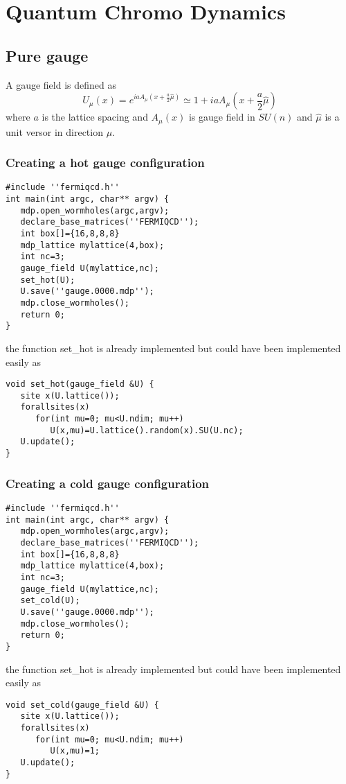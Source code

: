 \section{Quantum Chromo Dynamics}

\subsection{Pure gauge}

A gauge field is defined as 
\[
U_\mu (x)=e^{iaA_\mu (x+\frac a2\widehat{\mu })}\simeq 1+iaA_\mu (x+\frac a2%
\widehat{\mu })
\]
where $a$ is the lattice spacing and $A_\mu (x)$ is gauge field in $SU(n)$
and $\widehat{\mu }$ is a unit versor in direction $\mu $.

\subsubsection{Creating a hot gauge configuration}
\begin{verbatim}
#include ''fermiqcd.h''
int main(int argc, char** argv) {
   mdp.open_wormholes(argc,argv);
   declare_base_matrices(''FERMIQCD'');
   int box[]={16,8,8,8}
   mdp_lattice mylattice(4,box);
   int nc=3;
   gauge_field U(mylattice,nc);
   set_hot(U);
   U.save(''gauge.0000.mdp'');
   mdp.close_wormholes();
   return 0;
}
\end{verbatim}

the function set\_hot is already implemented but could have been implemented
easily as 
\begin{verbatim}
void set_hot(gauge_field &U) {
   site x(U.lattice());
   forallsites(x)
      for(int mu=0; mu<U.ndim; mu++)
         U(x,mu)=U.lattice().random(x).SU(U.nc);
   U.update();
}
\end{verbatim}

\subsubsection{Creating a cold gauge configuration}
\begin{verbatim}
#include ''fermiqcd.h''
int main(int argc, char** argv) {
   mdp.open_wormholes(argc,argv);
   declare_base_matrices(''FERMIQCD'');
   int box[]={16,8,8,8}
   mdp_lattice mylattice(4,box);
   int nc=3;
   gauge_field U(mylattice,nc);
   set_cold(U);
   U.save(''gauge.0000.mdp'');
   mdp.close_wormholes();
   return 0;
}
\end{verbatim}

the function set\_hot is already implemented but could have been implemented
easily as 
\begin{verbatim}
void set_cold(gauge_field &U) {
   site x(U.lattice());
   forallsites(x)
      for(int mu=0; mu<U.ndim; mu++)
         U(x,mu)=1;
   U.update();
} 
\end{verbatim}

